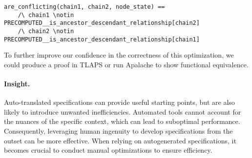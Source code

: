 \begin{lstlisting}[language=tla]
are_conflicting(chain1, chain2, node_state) ==
    /\ chain1 \notin PRECOMPUTED__is_ancestor_descendant_relationship[chain2]
    /\ chain2 \notin PRECOMPUTED__is_ancestor_descendant_relationship[chain1]
\end{lstlisting}

To further improve our confidence in the correctness of this optimization, we
could produce a proof in TLAPS or run Apalache to show functional equivalence.

\paragraph{Insight.} Auto-translated specifications can provide useful starting
points, but are also likely to introduce unwanted inefficiencies. Automated
tools cannot account for the nuances of the specific context, which can lead to
suboptimal performance. Consequently, leveraging human ingenuity to develop
specifications from the outset can be more effective. When relying on
autogenerated specifications, it becomes crucial to conduct manual optimizations
to ensure efficiency.
